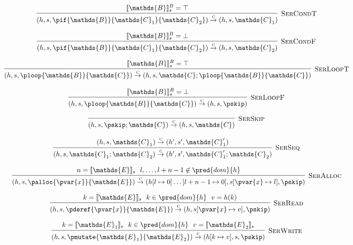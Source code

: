 \[
\infer[\textsc{SerCondT}]
{
	(h, s, \pif{\mathds{B}}{\mathds{C}_1}{\mathds{C}_2})
	\overset{\textsc{c}}{\rightarrow}
	(h, s, \mathds{C}_1)
}
{
	\llbracket \mathds{B} \rrbracket_s^B = \top
}
\]

\[
\infer[\textsc{SerCondF}]
{
	(h, s, \pif{\mathds{B}}{\mathds{C}_1}{\mathds{C}_2})
	\overset{\textsc{c}}{\rightarrow}
	(h, s, \mathds{C}_2)
}
{
	\llbracket \mathds{B} \rrbracket_s^B = \bot
}
\]

\[
\infer[\textsc{SerLoopT}]
{
	(h, s, \ploop{\mathds{B}}{\mathds{C}})
	\overset{\textsc{c}}{\rightarrow}
	(h, s, \mathds{C}; \ploop{\mathds{B}}{\mathds{C}})
}
{
	\llbracket \mathds{B} \rrbracket_s^B = \top
}
\]

\[
\infer[\textsc{SerLoopF}]
{
	(h, s, \ploop{\mathds{B}}{\mathds{C}})
	\overset{\textsc{c}}{\rightarrow}
	(h, s, \pskip)
}
{
	\llbracket \mathds{B} \rrbracket_s^B = \bot
}
\]

\[
\infer[\textsc{SerSkip}]
{
	(h, s, \pskip ; \mathds{C})
	\overset{\textsc{c}}{\rightarrow}
	(h, s, \mathds{C})
}
{}
\]

\[
\infer[\textsc{SerSeq}]
{
	(h, s, \mathds{C}_1 ; \mathds{C}_2)
	\overset{\textsc{c}}{\rightarrow}
	(h', s', \mathds{C}_1' ; \mathds{C}_2)
}
{
	(h, s, \mathds{C}_1)
	\overset{\textsc{c}}{\rightarrow}
	(h', s',\mathds{C}_1')
}
\]

\[
\infer[\textsc{SerAlloc}]
{
	(h, s, \palloc{\pvar{x}}{\mathds{E}})
	\overset{\textsc{c}}{\rightarrow}
	(h[l \mapsto 0] \ldots [l + n - 1 \mapsto 0], s[\pvar{x} \mapsto l], \pskip)
}
{
	n = \llbracket \mathds{E} \rrbracket_s\ \
	l, \ldots, l + n - 1 \not\in \pred{dom}{h}
}
\]

\[
\infer[\textsc{SerRead}]
{
	(h, s, \pderef{\pvar{x}}{\mathds{E}})
	\overset{\textsc{c}}{\rightarrow}
	(h, s[\pvar{x} \mapsto v], \pskip)
}
{
	k = \llbracket \mathds{E} \rrbracket_s\ \
	k \in \pred{dom}{h}\ \
	v = h(k)
}
\]

\[
\infer[\textsc{SerWrite}]
{
	(h, s, \pmutate{\mathds{E}_1}{\mathds{E}_2})
	\overset{\textsc{c}}{\rightarrow}
	(h[k \mapsto v], s, \pskip)
}
{
	k = \llbracket \mathds{E}_1 \rrbracket_s\ \
	k \in \pred{dom}{h}\ \
	v = \llbracket \mathds{E}_2 \rrbracket_s
}
\]
